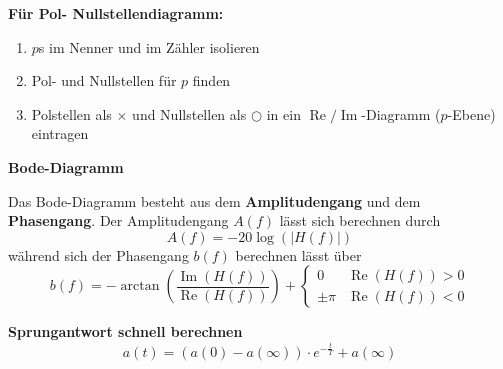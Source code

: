 \documentclass[12pt, a4paper, twoside]{scrartcl}
\begin{document}
\textbf{Für Pol- Nullstellendiagramm:}

\begin{enumerate}
\item \(p\)s im Nenner und im Zähler isolieren
\item Pol- und Nullstellen für \(p\) finden
\item Polstellen als \(\times\) und Nullstellen als \(\bigcirc\) in ein \(\operatorname{Re} / \operatorname{Im}\)-Diagramm (\(p\)-Ebene) eintragen
\end{enumerate}

\textbf{Bode-Diagramm}

Das Bode-Diagramm besteht aus dem \textbf{Amplitudengang} und dem \textbf{Phasengang}. Der Amplitudengang \(A(f)\) lässt sich berechnen durch
\[A(f) = -20\log(|H(f)|)\]
während sich der Phasengang \(b(f)\) berechnen lässt über
\[b(f) = -\arctan\left(\frac{\operatorname{Im}(H(f))}{\operatorname{Re}(H(f))}\right) +
  \begin{cases}
    0 & \operatorname{Re}(H(f)) > 0\\
    \pm \pi & \operatorname{Re}(H(f)) < 0
  \end{cases}
\]

\textbf{Sprungantwort schnell berechnen}
\[a(t) = (a(0) - a(\infty)) \cdot e^{-\frac{t}{T}} + a(\infty)\]
\end{document}

